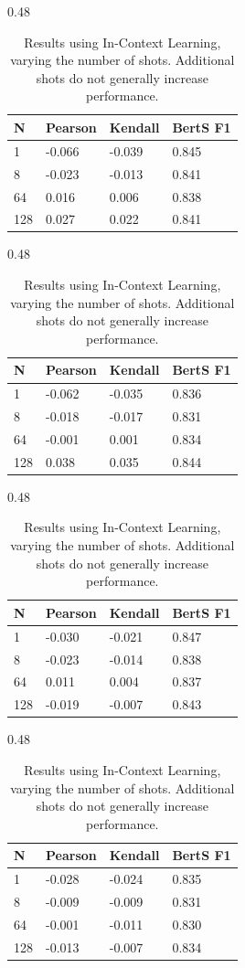\begin{table}[h!]
    \centering
    \scriptsize
\begin{subtable}[t]{0.48\textwidth}
\centering
\begin{tabular}{l|lll}
\textbf{N} & \textbf{Pearson} & \textbf{Kendall} & \textbf{BertS F1} \\ \hline
1 & -0.066 & -0.039 & 0.845 \\
8 & -0.023 & -0.013 & 0.841 \\
64 & 0.016 & 0.006 & 0.838 \\
128 & 0.027 & 0.022 & 0.841 \\
\end{tabular}
\caption{Elife}
\label{tab:icl-mini-elife}
\end{subtable}
\hfill
\begin{subtable}[t]{0.48\textwidth}
\centering
\begin{tabular}{l|lll}
\textbf{N} & \textbf{Pearson} & \textbf{Kendall} & \textbf{BertS F1} \\ \hline
1 & -0.062 & -0.035 & 0.836 \\
8 & -0.018 & -0.017 & 0.831 \\
64 & -0.001 & 0.001 & 0.834 \\
128 & 0.038 & 0.035 & 0.844 \\
\end{tabular}
\caption{Eureka}
\label{tab:icl-mini-eureka}
\end{subtable}

\vspace{1em}

\begin{subtable}[t]{0.48\textwidth}
\centering
\begin{tabular}{l|lll}
\textbf{N} & \textbf{Pearson} & \textbf{Kendall} & \textbf{BertS F1} \\ \hline
1 & -0.030 & -0.021 & 0.847 \\
8 & -0.023 & -0.014 & 0.838 \\
64 & 0.011 & 0.004 & 0.837 \\
128 & -0.019 & -0.007 & 0.843 \\
\end{tabular}
\caption{PLOS}
\label{tab:icl-mini-plos}
\end{subtable}
\hfill
\begin{subtable}[t]{0.48\textwidth}
\centering
\begin{tabular}{l|lll}
\textbf{N} & \textbf{Pearson} & \textbf{Kendall} & \textbf{BertS F1} \\ \hline
1 & -0.028 & -0.024 & 0.835 \\
8 & -0.009 & -0.009 & 0.831 \\
64 & -0.001 & -0.011 & 0.830 \\
128 & -0.013 & -0.007 & 0.834 \\
\end{tabular}
\caption{SciNews}
\label{tab:icl-mini-scinews}
\end{subtable}
\caption{Results using In-Context Learning, varying the number of shots. Additional shots do not generally increase performance.}
\label{tab:icl-mini}
\end{table}